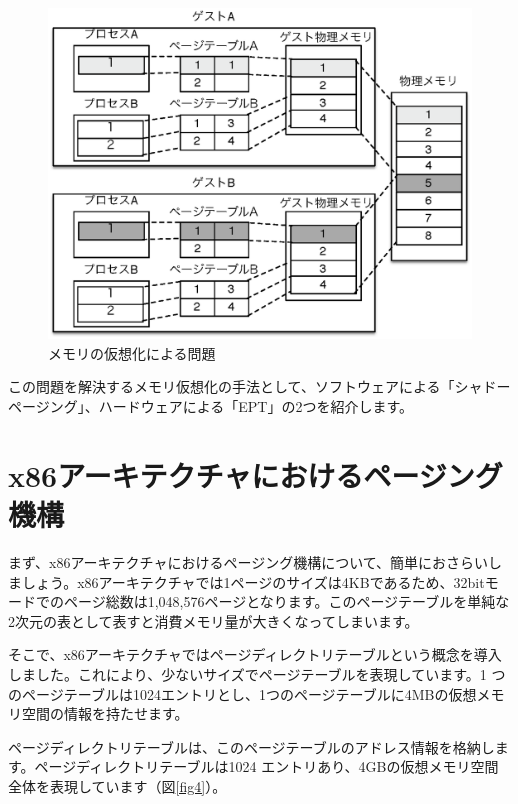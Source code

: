 \begin{figure}\centering
\includegraphics{figures/part2_fig3.eps}
\caption{メモリの仮想化による問題}
\label{fig3}
\end{figure}

この問題を解決するメモリ仮想化の手法として、ソフトウェアによる「シャドーページング」、ハードウェアによる「EPT」の2つを紹介します。

\section{x86アーキテクチャにおけるページング機構}
まず、x86アーキテクチャにおけるページング機構について、簡単におさらいしましょう。x86アーキテクチャでは1ページのサイズは4KBであるため、32bitモードでのページ総数は1,048,576ページとなります。このページテーブルを単純な2次元の表として表すと消費メモリ量が大きくなってしまいます。

そこで、x86アーキテクチャではページディレクトリテーブルという概念を導入しました。これにより、少ないサイズでページテーブルを表現しています。1 つのページテーブルは1024エントリとし、1つのページテーブルに4MBの仮想メモリ空間の情報を持たせます。

ページディレクトリテーブルは、このページテーブルのアドレス情報を格納します。ページディレクトリテーブルは1024 エントリあり、4GBの仮想メモリ空間全体を表現しています（図\ref{fig4}）。

